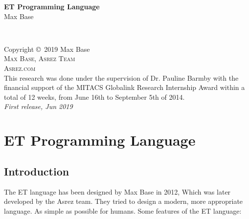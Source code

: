 \documentclass[11pt,fleqn]{book}
\begin{document}
\begingroup
\thispagestyle{empty}
 \centering
\vspace*{5cm}
\par\normalfont\fontsize{35}{35}\sffamily\selectfont
\textbf{ET Programming Language}\\
\vspace*{1cm}
{\Huge Max Base}\par
\endgroup
\newpage
~\vfill
\thispagestyle{empty}

\noindent Copyright \copyright\ 2019 Max Base\\ 

\noindent \textsc{Max Base, Asrez Team}\\
\noindent \textsc{Asrez.com}\\

\noindent This research was done under the supervision of Dr. Pauline Barmby with the financial support of the MITACS Globalink Research Internship Award within a total of 12 weeks, from June 16th to September 5th of 2014.\\

\noindent \textit{First release, Jun 2019}
\pagestyle{empty}
\tableofcontents
\pagestyle{fancy}
\chapter{ET Programming Language}
\section{Introduction}

The ET language has been designed by Max Base in 2012, Which was later
developed by the Asrez team. They tried to design a modern, more appropriate language. As
simple as possible for humans.
Some features of the ET language:
\end{document}
